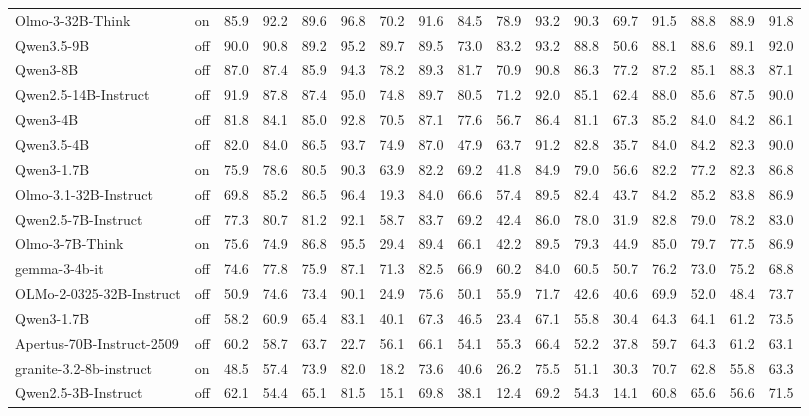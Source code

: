 \begin{table}
{\begin{tabular}{llrrrrrrrrrrrrrrr}
Olmo-3-32B-Think & on & 85.9 & 92.2 & 89.6 & 96.8 & 70.2 & 91.6 & 84.5 & 78.9 & 93.2 & 90.3 & 69.7 & 91.5 & 88.8 & 88.9 & 91.8 \\
Qwen3.5-9B & off & 90.0 & 90.8 & 89.2 & 95.2 & 89.7 & 89.5 & 73.0 & 83.2 & 93.2 & 88.8 & 50.6 & 88.1 & 88.6 & 89.1 & 92.0 \\
Qwen3-8B & off & 87.0 & 87.4 & 85.9 & 94.3 & 78.2 & 89.3 & 81.7 & 70.9 & 90.8 & 86.3 & 77.2 & 87.2 & 85.1 & 88.3 & 87.1 \\
Qwen2.5-14B-Instruct & off & 91.9 & 87.8 & 87.4 & 95.0 & 74.8 & 89.7 & 80.5 & 71.2 & 92.0 & 85.1 & 62.4 & 88.0 & 85.6 & 87.5 & 90.0 \\
Qwen3-4B & off & 81.8 & 84.1 & 85.0 & 92.8 & 70.5 & 87.1 & 77.6 & 56.7 & 86.4 & 81.1 & 67.3 & 85.2 & 84.0 & 84.2 & 86.1 \\
Qwen3.5-4B & off & 82.0 & 84.0 & 86.5 & 93.7 & 74.9 & 87.0 & 47.9 & 63.7 & 91.2 & 82.8 & 35.7 & 84.0 & 84.2 & 82.3 & 90.0 \\
Qwen3-1.7B & on & 75.9 & 78.6 & 80.5 & 90.3 & 63.9 & 82.2 & 69.2 & 41.8 & 84.9 & 79.0 & 56.6 & 82.2 & 77.2 & 82.3 & 86.8 \\
Olmo-3.1-32B-Instruct & off & 69.8 & 85.2 & 86.5 & 96.4 & 19.3 & 84.0 & 66.6 & 57.4 & 89.5 & 82.4 & 43.7 & 84.2 & 85.2 & 83.8 & 86.9 \\
Qwen2.5-7B-Instruct & off & 77.3 & 80.7 & 81.2 & 92.1 & 58.7 & 83.7 & 69.2 & 42.4 & 86.0 & 78.0 & 31.9 & 82.8 & 79.0 & 78.2 & 83.0 \\
Olmo-3-7B-Think & on & 75.6 & 74.9 & 86.8 & 95.5 & 29.4 & 89.4 & 66.1 & 42.2 & 89.5 & 79.3 & 44.9 & 85.0 & 79.7 & 77.5 & 86.9 \\
gemma-3-4b-it & off & 74.6 & 77.8 & 75.9 & 87.1 & 71.3 & 82.5 & 66.9 & 60.2 & 84.0 & 60.5 & 50.7 & 76.2 & 73.0 & 75.2 & 68.8 \\
OLMo-2-0325-32B-Instruct & off & 50.9 & 74.6 & 73.4 & 90.1 & 24.9 & 75.6 & 50.1 & 55.9 & 71.7 & 42.6 & 40.6 & 69.9 & 52.0 & 48.4 & 73.7 \\
Qwen3-1.7B & off & 58.2 & 60.9 & 65.4 & 83.1 & 40.1 & 67.3 & 46.5 & 23.4 & 67.1 & 55.8 & 30.4 & 64.3 & 64.1 & 61.2 & 73.5 \\
Apertus-70B-Instruct-2509 & off & 60.2 & 58.7 & 63.7 & 22.7 & 56.1 & 66.1 & 54.1 & 55.3 & 66.4 & 52.2 & 37.8 & 59.7 & 64.3 & 61.2 & 63.1 \\
granite-3.2-8b-instruct & on & 48.5 & 57.4 & 73.9 & 82.0 & 18.2 & 73.6 & 40.6 & 26.2 & 75.5 & 51.1 & 30.3 & 70.7 & 62.8 & 55.8 & 63.3 \\
Qwen2.5-3B-Instruct & off & 62.1 & 54.4 & 65.1 & 81.5 & 15.1 & 69.8 & 38.1 & 12.4 & 69.2 & 54.3 & 14.1 & 60.8 & 65.6 & 56.6 & 71.5 \\

\end{tabular}}
\end{table}
